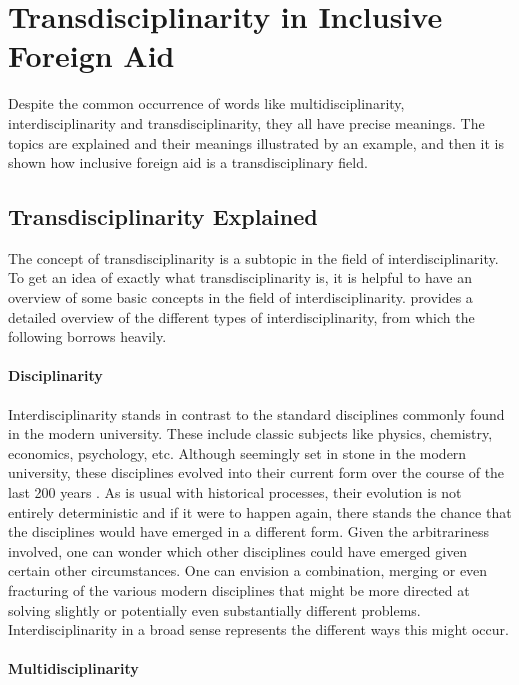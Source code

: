 \documentclass[a4paper]{article}
\begin{document}
\newpage

\section{Transdisciplinarity in Inclusive Foreign Aid}

Despite the common occurrence of words like multidisciplinarity,
interdisciplinarity and transdisciplinarity, they all have precise meanings.
The topics are explained and their meanings illustrated by an example, and
then it is shown how inclusive foreign aid is a transdisciplinary field.

\subsection{Transdisciplinarity Explained}

The concept of transdisciplinarity is a subtopic in the field of
interdisciplinarity. To get an idea of exactly what transdisciplinarity is, it
is helpful to have an overview of some basic concepts in the field of
interdisciplinarity. \cite{klein2010taxonomy} provides a detailed overview of
the different types of interdisciplinarity, from which the following borrows
heavily.

\paragraph{Disciplinarity}

Interdisciplinarity stands in contrast to the standard disciplines commonly
found in the modern university. These include classic subjects like physics,
chemistry, economics, psychology, etc. Although seemingly set in stone in the
modern university, these disciplines evolved into their current form over the
course of the last 200 years \citep{weingart2010short}. As is usual with
historical processes, their evolution is not entirely deterministic and if it
were to happen again, there stands the chance that the disciplines would have
emerged in a different form. Given the arbitrariness involved, one can wonder
which other disciplines could have emerged given certain other circumstances.
One can envision a combination, merging or even fracturing of the various
modern disciplines that might be more directed at solving slightly or
potentially even substantially different problems. Interdisciplinarity in a
broad sense represents the different ways this might occur.

\paragraph{Multidisciplinarity}
\end{document}
